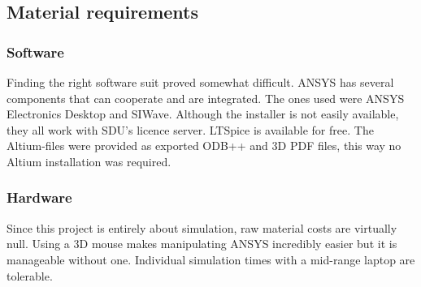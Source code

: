 \subsection{Material requirements}
\label{sec:material_requirements}

\subsubsection{Software}
\label{software_requirements}

Finding the right software suit proved somewhat difficult. ANSYS has several components that can cooperate and are integrated. The ones used were ANSYS Electronics Desktop and SIWave. Although the installer is not easily available, they all work with SDU's licence server. LTSpice is available for free. The Altium-files were provided as exported ODB++ and 3D PDF files, this way no Altium installation was required.

\subsubsection{Hardware}
\label{hardware_requirements}

Since this project is entirely about simulation, raw material costs are virtually null. Using a 3D mouse makes manipulating ANSYS incredibly easier but it is manageable without one. Individual simulation times with a mid-range laptop are tolerable.